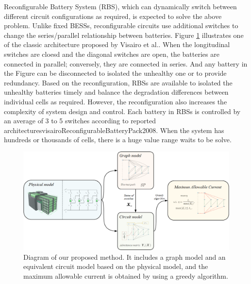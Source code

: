 \documentclass{article}
\begin{document}
Reconfigurable Battery System (RBS), which can dynamically  switch between different circuit configurations as required, is expected to solve the above problem\cite{hanNextGenerationBatteryManagement2020a}. 
Unlike fixed BESSs, reconfigurable circuits use additional switches to change the series/parallel relationship between batteries.
Figure \ref{fig:1} illustrates one of the classic architecture proposed by Visairo et al.\cite{visairoReconfigurableBatteryPack2008}.
When the longitudinal switches are cloesd and the diagonal switches are open, the batteries are connected in parallel; conversely, they are connected in series.
And any battery in the Figure can be disconnected to isolated the unhealthy one or to provide redundancy.
Based on the reconfiguration, RBSs are available to isolated the unhealthy batteries timely and balance the degradation differences between individual cells as required.
However, the reconfiguration also increases the complexity of system design and control.
Each battery in RBSs is controlled by an average of 3 to 5 switches according to reported architectures\cite{taesickimSeriesconnectedSelfreconfigurableMulticell2012,heReconfigurationassistedChargingLargescale2014,lawsonSoftwareConfigurableBattery2012,kimBalancedReconfigurationStorage2011,kimDependableEfficientScalable2010}visairoReconfigurableBatteryPack2008.
When the system has hundreds or thousands of cells, there is a huge value range waits to be solve.

\begin{figure}
    \centering
    \includegraphics[width=\textwidth]{../attachments/fig1-v2.png}
    \caption{Diagram of our proposed method. It includes a graph model and an equivalent circuit model based on the physical model, and the maximum allowable current is obtained by using a greedy algorithm.}
    \label{fig:1}
\end{figure}
\end{document}
